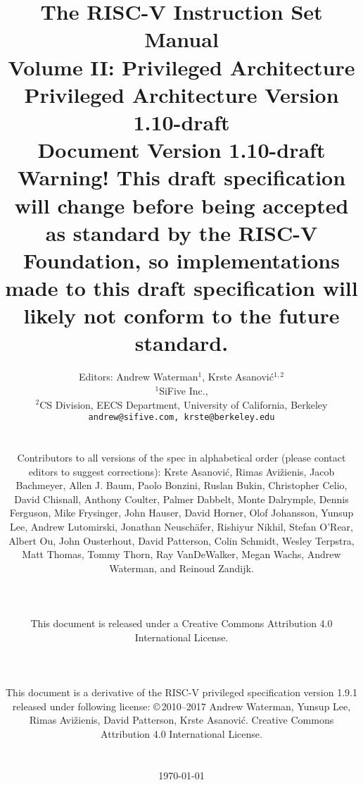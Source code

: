 \documentclass[twoside,11pt]{book}
\newcommand{\privrev}{1.10-draft}
\begin{document}
\title{{\vspace{-0.7in}\Large {\bf The RISC-V Instruction Set Manual}} \\
  \large {\bf Volume II: Privileged Architecture} \\
  Privileged Architecture Version \privrev \\
  Document Version \privrev \\
    {\bf Warning! This draft specification
    will change before being accepted as standard by the RISC-V Foundation, so
    implementations made to this draft specification will likely not conform
    to the future standard.}
  \vspace{-0.1in}}

\author{Editors: Andrew Waterman$^{1}$, Krste Asanovi\'{c}$^{1,2}$ \\
  $^{1}$SiFive Inc., \\
  $^{2}$CS Division, EECS Department, University of California, Berkeley \\
  {\tt andrew@sifive.com, krste@berkeley.edu} \\
  \\
  \parbox{\textwidth}{ Contributors to all versions of the spec in
    alphabetical order (please contact editors to suggest
    corrections): Krste Asanovi\'{c}, Rimas Avi\v{z}ienis, Jacob
    Bachmeyer, Allen J. Baum, Paolo Bonzini, Ruslan Bukin, Christopher
    Celio, David Chisnall, Anthony Coulter,
    Palmer Dabbelt, Monte Dalrymple, Dennis Ferguson,
    Mike Frysinger, John Hauser, David Horner, Olof Johansson, Yunsup Lee,
    Andrew Lutomirski, Jonathan Neusch{\"a}fer, Rishiyur Nikhil,
    Stefan O'Rear, Albert Ou, John Ousterhout, David Patterson, Colin
    Schmidt, Wesley Terpstra, Matt Thomas, Tommy Thorn, Ray
    VanDeWalker, Megan Wachs, Andrew Waterman, and Reinoud Zandijk.}
  \\ \\
  \parbox{\textwidth}{
  This document is released under a Creative Commons Attribution 4.0
  International License.
  }
  \\
  \\
  \parbox{\textwidth}{
    This document is a derivative of the RISC-V
    privileged specification version 1.9.1 released under following license:
    \copyright \,2010--2017 Andrew Waterman, Yunsup Lee, Rimas
    Avi\v{z}ienis, David Patterson, Krste Asanovi\'{c}. 
    Creative Commons Attribution 4.0 International License.
  }
  \\
  \\
  \today
}
\end{document}
